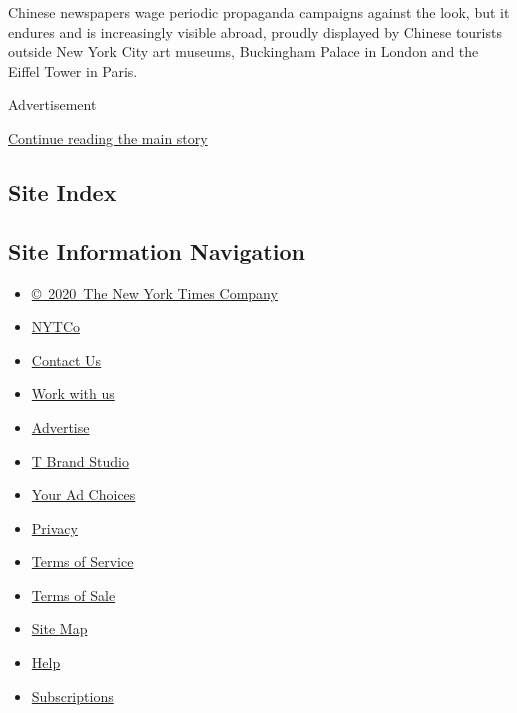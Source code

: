 Chinese newspapers wage periodic propaganda campaigns against the look,
but it endures and is increasingly visible abroad, proudly displayed by
Chinese tourists outside New York City art museums, Buckingham Palace in
London and the Eiffel Tower in Paris.

Advertisement

\protect\hyperlink{after-bottom}{Continue reading the main story}

\hypertarget{site-index}{%
\subsection{Site Index}\label{site-index}}

\hypertarget{site-information-navigation}{%
\subsection{Site Information
Navigation}\label{site-information-navigation}}

\begin{itemize}
\tightlist
\item
  \href{https://help.nytimes.com/hc/en-us/articles/115014792127-Copyright-notice}{©~2020~The
  New York Times Company}
\end{itemize}

\begin{itemize}
\tightlist
\item
  \href{https://www.nytco.com/}{NYTCo}
\item
  \href{https://help.nytimes.com/hc/en-us/articles/115015385887-Contact-Us}{Contact
  Us}
\item
  \href{https://www.nytco.com/careers/}{Work with us}
\item
  \href{https://nytmediakit.com/}{Advertise}
\item
  \href{http://www.tbrandstudio.com/}{T Brand Studio}
\item
  \href{https://www.nytimes.com/privacy/cookie-policy\#how-do-i-manage-trackers}{Your
  Ad Choices}
\item
  \href{https://www.nytimes.com/privacy}{Privacy}
\item
  \href{https://help.nytimes.com/hc/en-us/articles/115014893428-Terms-of-service}{Terms
  of Service}
\item
  \href{https://help.nytimes.com/hc/en-us/articles/115014893968-Terms-of-sale}{Terms
  of Sale}
\item
  \href{https://spiderbites.nytimes.com}{Site Map}
\item
  \href{https://help.nytimes.com/hc/en-us}{Help}
\item
  \href{https://www.nytimes.com/subscription?campaignId=37WXW}{Subscriptions}
\end{itemize}

